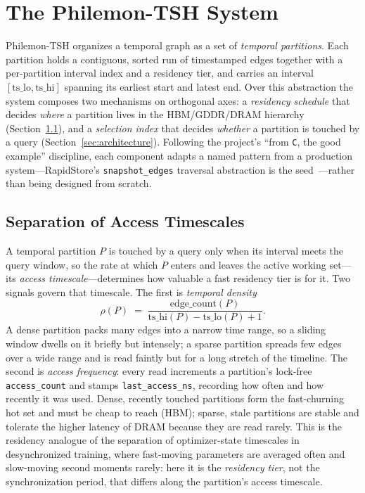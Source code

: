 \documentclass[10pt]{article}
\theoremstyle{definition}
\begin{document}
\section{The Philemon-TSH System}
\label{sec:system}

Philemon-TSH organizes a temporal graph as a set of \emph{temporal partitions}.
Each partition holds a contiguous, sorted run of timestamped edges together with a
per-partition interval index and a residency tier, and carries an interval
$[\mathrm{ts\_lo},\mathrm{ts\_hi}]$ spanning its earliest start and latest end.
Over this abstraction the system composes two mechanisms on orthogonal axes: a
\emph{residency schedule} that decides \emph{where} a partition lives in the
HBM/GDDR/DRAM hierarchy (Section~\ref{sec:timescales}), and a \emph{selection
index} that decides \emph{whether} a partition is touched by a query
(Section~\ref{sec:architecture}). Following the project's ``from \texttt{C}, the
good example'' discipline, each component adapts a named pattern from a production
system---RapidStore's \texttt{snapshot\_edges} traversal abstraction is the
seed~\citep{rapidstore}---rather than being designed from scratch.

\subsection{Separation of Access Timescales}
\label{sec:timescales}

A temporal partition $P$ is touched by a query only when its interval meets the
query window, so the rate at which $P$ enters and leaves the active working
set---its \emph{access timescale}---determines how valuable a fast residency tier
is for it. Two signals govern that timescale. The first is \emph{temporal density}
\[
  \rho(P) \;=\; \frac{\text{edge\_count}(P)}{\mathrm{ts\_hi}(P) - \mathrm{ts\_lo}(P) + 1}.
\]
A dense partition packs many edges into a narrow time range, so a sliding window
dwells on it briefly but intensely; a sparse partition spreads few edges over a
wide range and is read faintly but for a long stretch of the timeline. The second
is \emph{access frequency}: every read increments a partition's lock-free
\texttt{access\_count} and stamps \texttt{last\_access\_ns}, recording how often
and how recently it was used. Dense, recently touched partitions form the
fast-churning hot set and must be cheap to reach (HBM); sparse, stale partitions
are stable and tolerate the higher latency of DRAM because they are read rarely.
This is the residency analogue of the separation of optimizer-state timescales in
desynchronized training, where fast-moving parameters are averaged often and
slow-moving second moments rarely: here it is the \emph{residency tier}, not the
synchronization period, that differs along the partition's access timescale.
\end{document}

